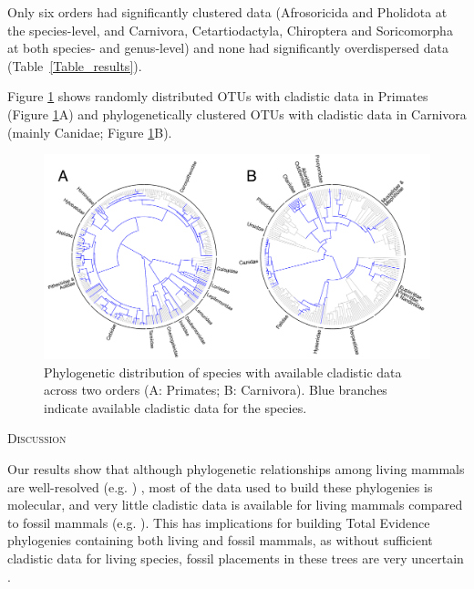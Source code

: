 \documentclass[12pt,letterpaper]{article}
\renewcommand{\section}[1]{%
\bigskip
\begin{center}
\begin{Large}
\normalfont\scshape #1
\medskip
\end{Large}
\end{center}}
\begin{document}


Only six orders had significantly clustered data (Afrosoricida and Pholidota at the species-level, and Carnivora, Cetartiodactyla, Chiroptera and Soricomorpha at both species- and genus-level) and none had significantly overdispersed data (Table~\ref{Table_results}).

Figure \ref{Figure_example_coverage} shows randomly distributed OTUs with cladistic data in Primates (Figure \ref{Figure_example_coverage}A) and phylogenetically clustered OTUs with cladistic data in Carnivora (mainly Canidae; Figure \ref{Figure_example_coverage}B).

\begin{figure}[!htbp]
\centering
    \includegraphics[width=1\textwidth]{example_coverage.pdf}
\caption{Phylogenetic distribution of species with available cladistic data across two orders (A: Primates; B: Carnivora).
Blue branches indicate available cladistic data for the species.}
\label{Figure_example_coverage}
\end{figure}

%
%

\section{Discussion}
Our results show that although phylogenetic relationships among living mammals are well-resolved (e.g. \cite{BinindaEmonds,meredithimpacts2011}) , most of the data used to build these phylogenies is molecular, and very little cladistic data is available for living mammals compared to fossil mammals (e.g. \cite{O'Leary08022013,ni2013oldest}).
This has implications for building Total Evidence phylogenies containing both living and fossil mammals, as without sufficient cladistic data for living species, fossil placements in these trees are very uncertain \cite{GuillermeCooper}.
\end{document}
